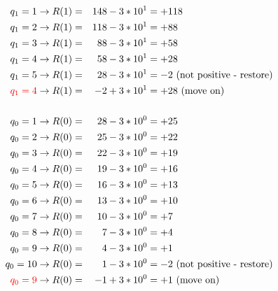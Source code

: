 \documentclass{article}
\begin{document}
\begin{align*}
    q_1 = 1                  & \rightarrow R(1) = & 148 - 3 * 10^1 & = +118                                \\
    q_1 = 2                  & \rightarrow R(1) = & 118 - 3 * 10^1 & = +88                                 \\
    q_1 = 3                  & \rightarrow R(1) = & 88 - 3 * 10^1  & = +58                                 \\
    q_1 = 4                  & \rightarrow R(1) = & 58 - 3 * 10^1  & = +28                                 \\
    q_1 = 5                  & \rightarrow R(1) = & 28 - 3 * 10^1  & = -2 \text{ (not positive - restore)} \\
    \textcolor{red}{q_1 = 4} & \rightarrow R(1) = & -2 + 3 * 10^1  & = +28 \text{ (move on)}               \\
    \\
    q_0 = 1                  & \rightarrow R(0) = & 28 - 3 * 10^0  & = +25                                 \\
    q_0 = 2                  & \rightarrow R(0) = & 25 - 3 * 10^0  & = +22                                 \\
    q_0 = 3                  & \rightarrow R(0) = & 22 - 3 * 10^0  & = +19                                 \\
    q_0 = 4                  & \rightarrow R(0) = & 19 - 3 * 10^0  & = +16                                 \\
    q_0 = 5                  & \rightarrow R(0) = & 16 - 3 * 10^0  & = +13                                 \\
    q_0 = 6                  & \rightarrow R(0) = & 13 - 3 * 10^0  & = +10                                 \\
    q_0 = 7                  & \rightarrow R(0) = & 10 - 3 * 10^0  & = +7                                  \\
    q_0 = 8                  & \rightarrow R(0) = & 7 - 3 * 10^0   & = +4                                  \\
    q_0 = 9                  & \rightarrow R(0) = & 4 - 3 * 10^0   & = +1                                  \\
    q_0 = 10                 & \rightarrow R(0) = & 1 - 3 * 10^0   & = -2 \text{ (not positive - restore)} \\
    \textcolor{red}{q_0 = 9} & \rightarrow R(0) = & -1 + 3 * 10^0  & = +1 \text{ (move on)}                \\
\end{align*}
\end{document}
